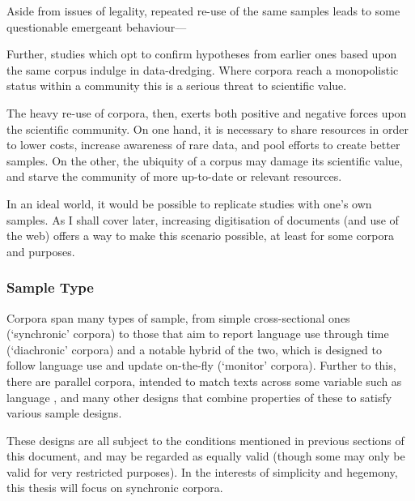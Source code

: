 
Aside from issues of legality, repeated re-use of the same samples leads to some questionable emergeant behaviour---%

Further, studies which opt to confirm hypotheses from earlier ones based upon the same corpus indulge in data-dredging.  Where corpora reach a monopolistic status within a community this is a serious threat to scientific value.





The heavy re-use of corpora, then, exerts both positive and negative forces upon the scientific community.  On one hand, it is necessary to share resources in order to lower costs, increase awareness of rare data, and pool efforts to create better samples.  On the other, the ubiquity of a corpus may damage its scientific value, and starve the community of more up-to-date or relevant resources.

In an ideal world, it would be possible to replicate studies with one's own samples.  As I shall cover later, increasing digitisation of documents (and use of the web) offers a way to make this scenario possible, at least for some corpora and purposes.




\subsubsection{Sample Type}
Corpora span many types of sample, from simple cross-sectional ones (`synchronic' corpora) to those that aim to report language use through time (`diachronic' corpora) and a notable hybrid of the two, which is designed to follow language use and update on-the-fly (`monitor' corpora).  Further to this, there are parallel corpora, intended to match texts across some variable such as language
, and many other designs that combine properties of these to satisfy various sample designs.


These designs are all subject to the conditions mentioned in previous sections of this document, and may be regarded as equally valid (though some may only be valid for very restricted purposes).  In the interests of simplicity and hegemony, this thesis will focus on synchronic corpora.








